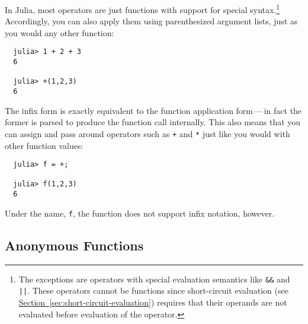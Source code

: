 \documentclass{article}
\renewcommand{\sec}[1]{\label{sec:#1}}
\newcommand{\Section}[1]{\hyperref[sec:#1]{Section~\ref*{sec:#1}}}
\begin{document}
In Julia, most operators are just functions with support for special syntax.\footnote{The exceptions are operators with special evaluation semantics like \texttt{\&\&} and \texttt{||}.
These operators cannot be functions since short-circuit evaluation (see \Section{short-circuit-evaluation}) requires that their operands are not evaluated before evaluation of the operator.}
Accordingly, you can also apply them using parenthesized argument lists, just as you would any other function:
\begin{verbatim}
  julia> 1 + 2 + 3
  6

  julia> +(1,2,3)
  6
\end{verbatim}
The infix form is exactly equivalent to the function application form\,---\,in fact the former is parsed to produce the function call internally.
This also means that you can assign and pass around operators such as \verb|+| and \verb|*| just like you would with other function values:
\begin{verbatim}
  julia> f = +;

  julia> f(1,2,3)
  6
\end{verbatim}
Under the name, \verb|f|, the function does not support infix notation, however.


\subsection{Anonymous Functions}\sec{anonymous-functions}
\end{document}
